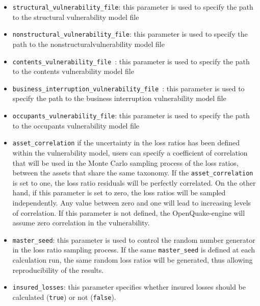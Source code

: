 \begin{itemize}

  \item \Verb+structural_vulnerability_file+: this parameter is used to
    specify the path to the structural \gls{vulnerability model} file

  \item \Verb+nonstructural_vulnerability_file+: this parameter is used to
    specify the path to the nonstructural\gls{vulnerability model} file

  \item \Verb+contents_vulnerability_file +: this parameter is used to
    specify the path to the contents \gls{vulnerability model} file

  \item \Verb+business_interruption_vulnerability_file +: this parameter is
    used to specify the path to the business interruption
    \gls{vulnerability model} file

  \item \Verb+occupants_vulnerability_file+: this parameter is used to
    specify the path to the occupants \gls{vulnerability model} file

  \item \texttt{asset\_correlation} if the uncertainty in the loss ratios
    has been defined within the \gls{vulnerability model}, users can specify
    a coefficient of correlation that will be used in the Monte Carlo sampling
    process of the loss ratios, between the assets that share the same
    \gls{taxonomy}. If the \texttt{asset\_correlation} is set to one,
    the loss ratio residuals will be perfectly correlated. On the other hand,
    if this parameter is set to zero, the loss ratios will be sampled
    independently. Any value between zero and one will lead to increasing
    levels of correlation. If this parameter is not defined, the
    OpenQuake-engine will assume zero correlation in the vulnerability.

  \item \Verb+master_seed+: this parameter is used to control the random
    number generator in the loss ratio sampling process. If the same
    \Verb+master_seed+ is defined at each calculation run, the same random loss
    ratios will be generated, thus allowing reproducibility of the results.

  \item \Verb+insured_losses+: this parameter specifies whether insured losses
    should be calculated (\Verb+true+) or not (\Verb+false+).

\end{itemize}